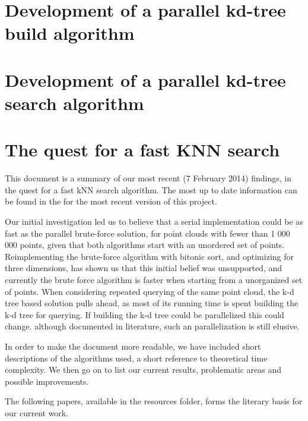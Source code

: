 \section{Development of a parallel kd-tree build algorithm} %
\label{sub:development_of_a_parallel_kd_tree_build_algorithm}


\section{Development of a parallel kd-tree search algorithm} %
\label{sub:development_of_a_parallel_kd_tree_search_algorithm}

\section{The quest for a fast KNN search} %
\label{sec:the_quest_for_a_fast_KNN_search}

This document is a summary of our most recent (7 February 2014) findings, in the quest for a fast kNN search algorithm. The most up to date information can be found in the
for the most recent version of this project.

Our initial investigation led us to believe that a serial implementation could be as fast as the parallel brute-force solution, for point clouds with fewer than 1 000 000 points, given that both algorithms start with an unordered set of points. Reimplementing the brute-force algorithm with bitonic sort, and optimizing for three dimensions, has shown us that this initial belief was unsupported, and currently the brute force algorithm is faster when starting from a unorganized set of points. When considering repeated querying of the same point cloud, the k-d tree based solution pulls ahead, as most of its running time is spent building the k-d tree for querying. If building the k-d tree could be parallelized this could change. although documented in literature, such an parallelization is still elusive.

In order to make the document more readable, we have included short descriptions of the algorithms used, a short reference to theoretical time complexity. We then go on to list our current results, problematic areas and possible improvements.

The following papers, available in the resources folder, forms the literary basis for our current work.

